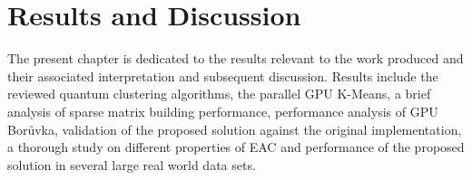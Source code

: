 


\chapter{Results and Discussion}
\label{chapter:results}

The present chapter is dedicated to the results relevant to the work produced and their associated interpretation and subsequent discussion.
Results include the reviewed quantum clustering algorithms, the parallel GPU K-Means, a brief analysis of sparse matrix building performance, performance analysis of GPU Borůvka, validation of the proposed solution against the original implementation, a thorough study on different properties of EAC and performance of the proposed solution in several large real world data sets.


%
%

